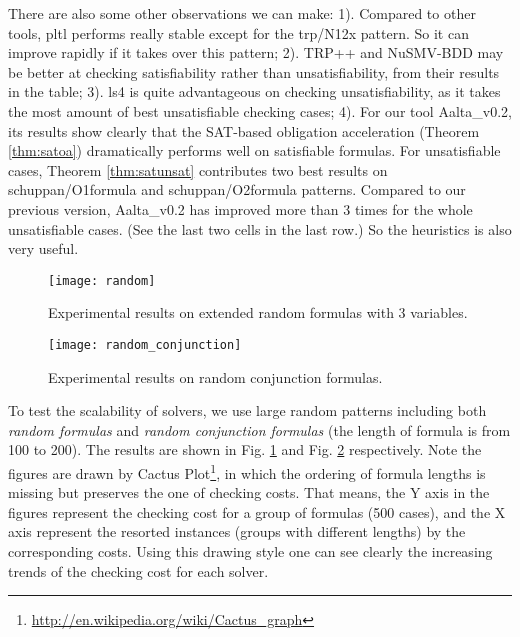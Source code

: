 \documentclass[conference]{IEEEtran}
\def\Aalta{{Aalta}}
\begin{document}
There are also some other observations we can make: 1). Compared to other tools, pltl performs 
really stable except for the \textsf{trp/N12x} pattern. So it can improve rapidly if it takes over 
this pattern; 2). TRP++ and NuSMV-BDD may be better at checking satisfiability rather than 
unsatisfiability, from their results in the table; 3). ls4 is quite advantageous on checking 
unsatisfiability, as it takes the most amount of best unsatisfiable checking cases; 4). For our 
tool \Aalta\_v0.2, its results show clearly that the SAT-based 
obligation acceleration (Theorem \ref{thm:satoa}) dramatically performs well on satisfiable formulas. 
For unsatisfiable cases, Theorem \ref{thm:satunsat} contributes two best results on 
\textsf{schuppan/O1formula} and \textsf{schuppan/O2formula} patterns. Compared to our previous 
version, \Aalta\_v0.2 has improved more than 3 times for the whole unsatisfiable cases. (See the 
last two cells in the last row.) So the heuristics is also very useful. 

\begin{figure}
\centering
\texttt{[image: random]}
\caption{Experimental results on extended random formulas with 3 variables.}
\label{fig:random}
\end{figure}

\begin{figure}
\centering
\texttt{[image: random\_conjunction]}
\caption{Experimental results on random conjunction formulas.}
\label{fig:random_conjunction}
\end{figure} 




\iffalse
\begin{figure}[t]
\begin{minipage}[b]{0.45\linewidth}
\centering
\texttt{[image: polsat\_sat]}
\caption{Polsat improvement on extended satisfiable random formulas with 3 variables.}
\label{fig:polsat_sat}
\end{minipage}
\hspace{0.6cm}
\begin{minipage}[b]{0.45\linewidth}
\centering
\texttt{[image: polsat\_unsat]}
\caption{Polsat improvement on extended unsatisfiable random formulas with 3 variables.}
\label{fig:polsat_unsat}
\end{minipage}
\end{figure}
\fi


To test the scalability of solvers, we use large random patterns 
including both \textit{random formulas} and \textit{random
  conjunction formulas} (the length of formula is from 100 to
200). The results are shown in Fig. \ref{fig:random} and
Fig. \ref{fig:random_conjunction} respectively. Note the figures are drawn by 
Cactus Plot\footnote{\url{http://en.wikipedia.org/wiki/Cactus_graph}}, in 
which the ordering of formula lengths is missing but preserves the one of checking costs. 
That means, the Y axis in the figures represent the checking cost for a group of formulas (500 cases), and the X axis represent the resorted instances (groups with different lengths) by 
the corresponding costs. Using this drawing style one can see clearly the increasing trends of 
the checking cost for each solver. 
\end{document}
